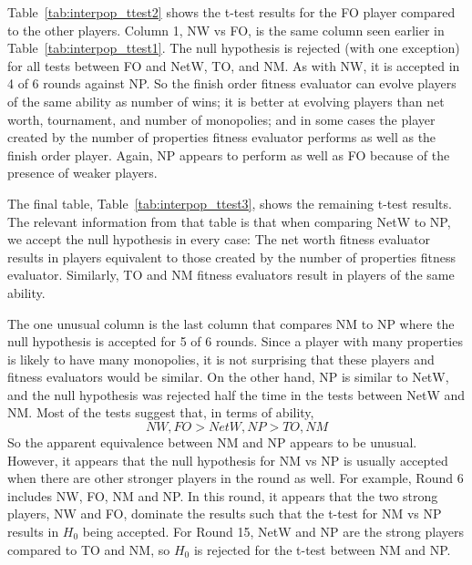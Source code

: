Table~\ref{tab:interpop_ttest2} shows the t-test results for the FO player
compared to the other players. Column 1, NW vs FO, is the same column seen
earlier in Table~\ref{tab:interpop_ttest1}. The null hypothesis is rejected
(with one exception) for all tests between FO and NetW, TO, and NM. As with NW,
it is accepted in 4 of 6 rounds against NP. So the finish order fitness
evaluator can evolve players of the same ability as number of wins; it is better
at evolving players than net worth, tournament, and number of monopolies; and in
some cases the player created by the number of properties fitness evaluator
performs as well as the finish order player. Again, NP appears to perform as
well as FO because of the presence of weaker players.

The final table, Table~\ref{tab:interpop_ttest3}, shows the remaining t-test
results. The relevant information from that table is that when comparing NetW to
NP, we accept the null hypothesis in every case: The net worth fitness evaluator
results in players equivalent to those created by the number of properties
fitness evaluator. Similarly, TO and NM fitness evaluators result in players of
the same ability. 

The one unusual column is the last column that compares NM to NP where the null
hypothesis is accepted for 5 of 6 rounds. Since a player with many properties is
likely to have many monopolies, it is not surprising that these players and
fitness evaluators would be similar. On the other hand, NP is similar to NetW,
and the null hypothesis was rejected half the time in the tests between NetW and
NM. Most of the tests suggest that, in terms of ability,
\begin{equation*}
NW,FO>NetW,NP>TO,NM
\end{equation*}
So the apparent equivalence between NM and NP appears to be unusual. However,
it appears that the null hypothesis for NM vs NP is usually accepted when there
are other stronger players in the round as well. For example, Round 6 includes 
NW, FO, NM and NP. In this round, it appears that the two strong players, NW and
FO, dominate the results such that the t-test for NM vs NP results in $H_{0}$
being accepted. For Round 15, NetW and NP are the strong players compared to TO
and NM, so $H_{0}$ is rejected for the t-test between NM and NP.


